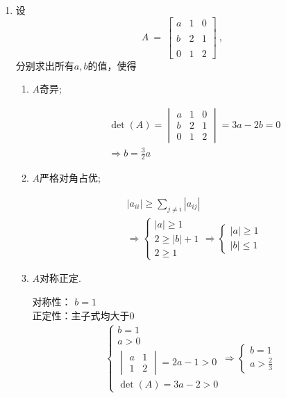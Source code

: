 \documentclass[a4paper]{article}
\begin{document}
\begin{enumerate}
  \item 设
  $$A\:=\:\begin{bmatrix}a&1&0\\\\b&2&1\\\\0&1&2\end{bmatrix}\:,$$
  分别求出所有$a,b$的值，使得
  \begin{enumerate}[label=（\arabic*）]
    \item $A$奇异;
    \begin{solution}
      \begin{align*}
        &\det(A)=\begin{vmatrix}a&1&0\\b&2&1\\0&1&2\end{vmatrix}=3a-2b=0\\
        &\Rightarrow b=\frac{3}{2}a
      \end{align*}
    \end{solution}
    \item $A$严格对角占优;
    \begin{solution}
        \begin{align*}
          &|a_{ii}|\geq\sum_{j\neq i}|a_{ij}|\\
          &\Rightarrow 
          \begin{cases}
            |a|\geq1\\
            2\geq|b|+1\\
            2\geq1
          \end{cases}
          \Rightarrow 
          \begin{cases}
            |a|\geq1\\
            |b|\leq1
          \end{cases}
        \end{align*}
    \end{solution}
    \item $A$对称正定.
    \begin{solution}
        对称性： $b=1$ \\
        正定性：主子式均大于0
        \begin{align*}
          \begin{cases}
            b = 1 \\
            a > 0 \\
            \begin{vmatrix}a & 1 \\ 1 & 2\end{vmatrix} = 2a - 1 > 0\\
            \det(A) = 3a - 2 > 0
          \end{cases}
          \Rightarrow
          \begin{cases}
            b = 1 \\
            a > \frac{2}{3}
          \end{cases}
        \end{align*}
    \end{solution}

  \end{enumerate}
\end{enumerate}
\end{document}
